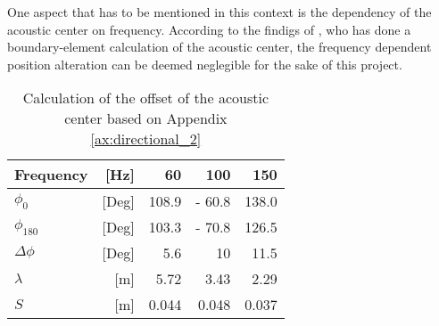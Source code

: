 One aspect that has to be mentioned in this context is the dependency of the acoustic center on frequency. According to the findigs of \citep{vanderkooy10}, who has done a boundary-element calculation of the acoustic center, the frequency dependent position alteration can be deemed  neglegible for the sake of this project.
\begin{table}[H]
\centering
\caption{Calculation of the offset of the acoustic center based on Appendix \ref{ax:directional_2}}
\label{tab:shift_meas2}
\begin{tabular}{|lr|r|r|r|}
\hline
Frequency              & {[}Hz{]}  & 60    & 100    & 150   \\ \hline
\(\phi_0\)             & {[}Deg{]} & 108.9 & - 60.8 & 138.0 \\ \hline
\(\phi_{180}\)         & {[}Deg{]} & 103.3 & - 70.8 & 126.5 \\ \hline
\(\Delta\phi\)         & {[}Deg{]} & 5.6   & 10     & 11.5  \\ \hline
\(\lambda\)            & {[}m{]}   & 5.72  & 3.43   & 2.29  \\ \hline
\(S\)                  & {[}m{]}   & 0.044 & 0.048  & 0.037 \\ \hline
\end{tabular}
\end{table}
